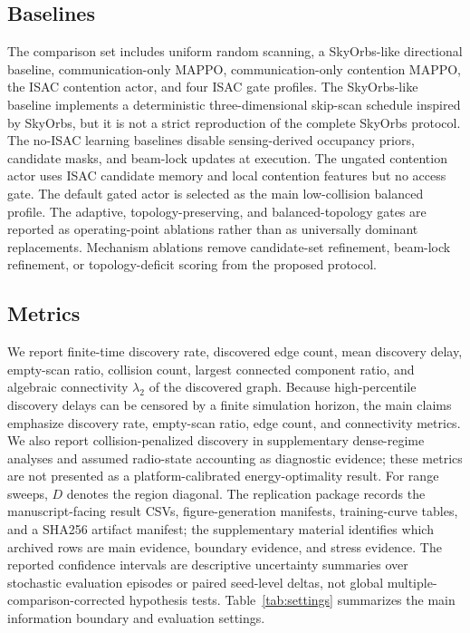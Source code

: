 \documentclass[journal]{IEEEtran}
\begin{document}
\subsection{Baselines}
The comparison set includes uniform random scanning, a SkyOrbs-like directional baseline, communication-only MAPPO, communication-only contention MAPPO, the ISAC contention actor, and four ISAC gate profiles.
The SkyOrbs-like baseline implements a deterministic three-dimensional skip-scan schedule inspired by SkyOrbs, but it is not a strict reproduction of the complete SkyOrbs protocol.
The no-ISAC learning baselines disable sensing-derived occupancy priors, candidate masks, and beam-lock updates at execution.
The ungated contention actor uses ISAC candidate memory and local contention features but no access gate.
The default gated actor is selected as the main low-collision balanced profile.
The adaptive, topology-preserving, and balanced-topology gates are reported as operating-point ablations rather than as universally dominant replacements.
Mechanism ablations remove candidate-set refinement, beam-lock refinement, or topology-deficit scoring from the proposed protocol.

\subsection{Metrics}
We report finite-time discovery rate, discovered edge count, mean discovery delay, empty-scan ratio, collision count, largest connected component ratio, and algebraic connectivity $\lambda_2$ of the discovered graph.
Because high-percentile discovery delays can be censored by a finite simulation horizon, the main claims emphasize discovery rate, empty-scan ratio, edge count, and connectivity metrics.
We also report collision-penalized discovery in supplementary dense-regime analyses and assumed radio-state accounting as diagnostic evidence; these metrics are not presented as a platform-calibrated energy-optimality result.
For range sweeps, $D$ denotes the region diagonal.
The replication package records the manuscript-facing result CSVs, figure-generation manifests, training-curve tables, and a SHA256 artifact manifest; the supplementary material identifies which archived rows are main evidence, boundary evidence, and stress evidence.
The reported confidence intervals are descriptive uncertainty summaries over stochastic evaluation episodes or paired seed-level deltas, not global multiple-comparison-corrected hypothesis tests.
Table~\ref{tab:settings} summarizes the main information boundary and evaluation settings.
\end{document}
